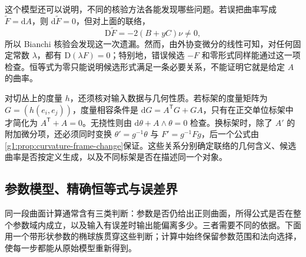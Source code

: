 这个模型还可以说明，不同的核验方法各能发现哪些问题。若误把曲率写成 \(\widetilde F=\mathrm{d}A\)，则 \(\mathrm{d}\widetilde F=0\)，但对上面的联络，
\[
	\mathrm{D}\widetilde F=-2(B+yC)\nu\ne0,
\]
所以 Bianchi 核验会发现这一次遗漏。然而，由外协变微分的线性可知，对任何固定常数 \(\lambda\)，都有 \(\mathrm{D}(\lambda F)=0\)；特别地，错误候选 \(-F\) 和零形式同样能通过这一项检查。恒等式为零只能说明候选形式满足一条必要关系，不能证明它就是给定 \(A\) 的曲率。

\ProseParagraphBreak

对切丛上的度量 \(h\)，还须核对输入数据与几何性质。若标架的度量矩阵为 \(G=(h(e_i,e_j))\)，度量相容条件是 \(\mathrm{d}G=A^{\mathsf T}G+GA\)，只有在正交单位标架中才简化为 \(A^{\mathsf T}+A=0\)。无挠性则由 \(\mathrm{d}\theta+A\wedge\theta=0\) 检查。换标架时，除了 \(A'\) 的附加微分项，还必须同时变换 \(\theta'=g^{-1}\theta\) 与 \(F'=g^{-1}Fg\)，后一个公式由\cref{g1:prop:curvature-frame-change}保证。这些关系分别确定联络的几何含义、候选曲率是否按定义生成，以及不同标架是否在描述同一个对象。

\subsection{参数模型、精确恒等式与误差界}
\label{g1:subsec:C01:03}

同一段曲面计算通常含有三类判断：参数是否仍给出正则曲面，所得公式是否在整个参数域内成立，以及输入有误差时输出能偏离多少。三者需要不同的依据。下面用一个带形状参数的椭球族贯穿这些判断；计算中始终保留参数范围和法向选择，使每一步都能从原始模型重新得到。

